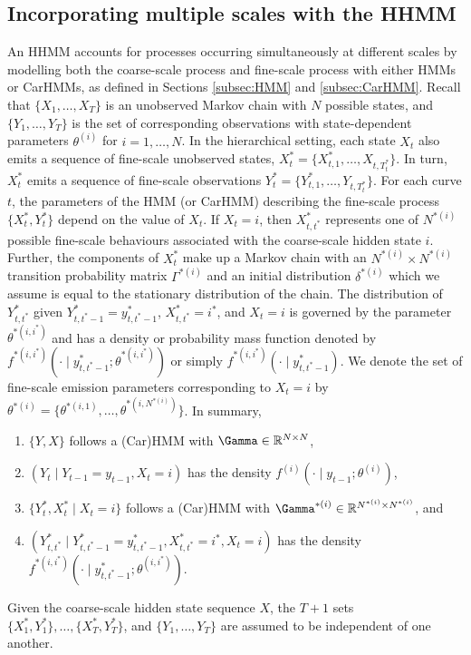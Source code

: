 \subsection{Incorporating multiple scales with the HHMM}
\label{subsec:HHMM}

An HHMM accounts for processes occurring simultaneously at different scales by modelling both the coarse-scale process and fine-scale process with either HMMs \citep{Barajas:2017,Adam:2019} or CarHMMs, as defined in Sections \ref{subsec:HMM} and \ref{subsec:CarHMM}. Recall that $\{X_1, \ldots, X_T\}$ is an unobserved Markov chain with $N$ possible states, and $\{Y_1, \ldots, Y_T\}$ is the set of corresponding observations with state-dependent parameters $\theta^{(i)}$ for $i = 1,\ldots,N$.   
%
In the hierarchical setting, each state $X_t$ also emits a sequence of fine-scale unobserved states, $X^*_t = \{X_{t,1}^*,\ldots, X_{t,T_t^*}\}$. In turn, $X^*_t$ emits a sequence of fine-scale observations $Y^*_t = \{Y_{t,1}^*,\ldots, Y_{t,T_t^*}\}$. For each curve $t$, the parameters of the HMM (or CarHMM) describing the fine-scale process $\{X^*_t, Y^*_t\}$ depend on the value of $X_t$. If $X_t = i$, then $X^*_{t,t^*}$ represents one of $N^{*(i)}$ possible fine-scale behaviours associated with the coarse-scale hidden state $i$. Further, the components of $X^*_t$ make up a Markov chain with an $N^{*(i)} \times N^{*(i)}$ transition probability matrix $\Gamma^{*(i)}$ and an initial distribution $\delta^{*(i)}$ which we assume is equal to the stationary distribution of the chain. The distribution of $Y^*_{t,t^*}$ given $Y^*_{t,t^*-1} = y^*_{t,t^*-1}$, $X^*_{t,t^*}=i^*$, and $X_t=i$ is governed by the parameter $\theta^{*(i,i^*)}$ and has a density or probability mass function denoted by $f^{*(i,i^*)}\left(\cdot \mid y^*_{t,t^*-1}; \theta^{*(i,i^*)}\right)$ or simply $f^{*(i,i^*)}(\cdot \mid y^*_{t,t^*-1})$. We denote the set of fine-scale emission parameters corresponding to $X_t=i$ by $\theta^{*(i)}=\big\{\theta^{*(i,1)}, \ldots, \theta^{*\left(i,N^{*(i)}\right)}\big\}$. In summary,

\begin{enumerate}
    \item $\{Y, X\}$ follows a (Car)HMM with $\Gamma \in \bbR^{N \times N}$,
    \item $(Y_t  \mid  Y_{t-1} = y_{t-1}, X_t = i)$ has the density $f^{(i)}(\cdot \mid y_{t-1};\theta^{(i)})$,
    \item $\{Y^*_t,X^*_t  \mid  X_t = i\}$ follows a (Car)HMM with $\Gamma^{*(i)} \in \bbR^{N^{*(i)} \times N^{*(i)}}$, and
    \item $(Y^*_{t,t^*}  \mid  Y^*_{t,t^*-1} = y^*_{t,t^*-1}, X^*_{t,t^*} = i^*, X_t = i)$ has the density $f^{*(i,i^*)}(\cdot \mid y^{*}_{t,t^*-1};\theta^{(i,i^*)})$.    
\end{enumerate}
%
Given the coarse-scale hidden state sequence $X$, the $T+1$ sets $\{X_1^*, Y_1^*\}, \ldots, \{X^*_T, Y^*_T\}$, and $\{Y_1,\ldots,Y_T\}$ are assumed to be independent of one another.

